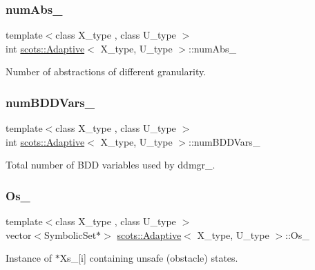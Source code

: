 \subsubsection{\texorpdfstring{num\+Abs\+\_\+}{numAbs\_}}
{\footnotesize\ttfamily template$<$class X\+\_\+type , class U\+\_\+type $>$ \\
int \hyperlink{classscots_1_1Adaptive}{scots\+::\+Adaptive}$<$ X\+\_\+type, U\+\_\+type $>$\+::num\+Abs\+\_\+}

Number of abstractions of different granularity. \mbox{\label{classscots_1_1Adaptive_a753d83283386610f1a2283af5cbeba73}} 
\subsubsection{\texorpdfstring{num\+B\+D\+D\+Vars\+\_\+}{numBDDVars\_}}
{\footnotesize\ttfamily template$<$class X\+\_\+type , class U\+\_\+type $>$ \\
int \hyperlink{classscots_1_1Adaptive}{scots\+::\+Adaptive}$<$ X\+\_\+type, U\+\_\+type $>$\+::num\+B\+D\+D\+Vars\+\_\+}

Total number of B\+DD variables used by ddmgr\+\_\+. \mbox{\label{classscots_1_1Adaptive_abed6bfd1256157d4b943078f6486ee36}} 
\subsubsection{\texorpdfstring{Os\+\_\+}{Os\_}}
{\footnotesize\ttfamily template$<$class X\+\_\+type , class U\+\_\+type $>$ \\
vector$<$Symbolic\+Set$\ast$$>$ \hyperlink{classscots_1_1Adaptive}{scots\+::\+Adaptive}$<$ X\+\_\+type, U\+\_\+type $>$\+::Os\+\_\+}

Instance of $\ast$\+Xs\+\_\+\mbox{[}i\mbox{]} containing unsafe (obstacle) states. \mbox{\label{classscots_1_1Adaptive_a88edb6662310c07120d07c9dff968ddc}} 

